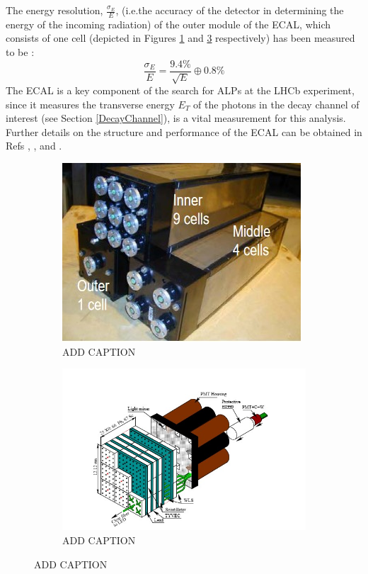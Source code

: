 The energy resolution, $\frac{\sigma_{E}}{E}$, (i.e.the accuracy of the detector in determining the energy of the incoming radiation) of the outer module of the ECAL, which consists of one cell (depicted in Figures \ref{ECALModule} and \ref{ECALStructure} respectively) has been measured to be \cite{GOLUTVIN2003258}:
\begin{equation}
    \frac{\sigma_{E}}{E} = \frac{9.4\%}{\sqrt{E}}\oplus 0.8\%
\end{equation}
The ECAL is a key component of the search for ALPs at the LHCb experiment, since it measures the transverse energy $E_{T}$ of the photons in the decay channel of interest (see Section \ref{DecayChannel}), is a vital measurement for this analysis. Further details on the structure and performance of the ECAL can be obtained in Refs \cite{Amato:494264}, \cite{AbellanBeteta:2020amj}, and \cite{GOLUTVIN2003258}.
\begin{figure}[H]
    \begin{subfigure}{0.4\textwidth}
    \includegraphics[scale = 0.8]{ECALModule.jpg}
    \caption{ADD CAPTION}
    \label{ECALModule}
    \end{subfigure}
    \hfill
    \begin{subfigure}{0.5\textwidth}
        \includegraphics[scale = 0.7]{ECALStructure.jpg}
        \caption{ADD CAPTION}
        \label{ECALStructure}
    \end{subfigure}
    \hfill
\end{figure}
